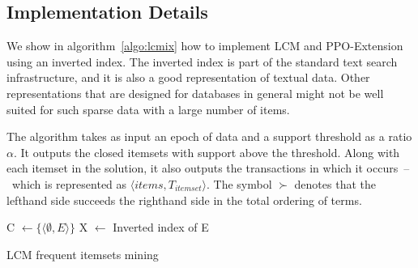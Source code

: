 \documentclass{sig-alternate}
\begin{document}
\subsection{Implementation Details}
We show in algorithm~\ref{algo:lcmix} how to implement LCM and PPO-Extension
using an inverted index.
The inverted index is part of the standard text search infrastructure,
and it is also a  good representation of textual data. 
Other representations that are designed for databases in general
might not be well suited for such sparse data with a large number of items. %

The algorithm takes as input an epoch of data and a support threshold as a
ratio $\alpha$.
It outputs the closed itemsets with support above the threshold.
Along with each itemset in the solution, it also outputs the transactions
in which it occurs~--~which is represented as $\langle items,
T_{itemset} \rangle$.
The symbol $\succ$ denotes that the lefthand side  succeeds the righthand
side in the total ordering of terms. 

\begin{algorithm}
\SetAlgoLined
\LinesNumbered
{}

C $\gets \{\langle \emptyset, E\rangle\}$ 
X $\gets$ Inverted index of E\;
\;


\caption{LCM frequent itemsets mining}
\label{algo:lcmix}
\end{algorithm}
\end{document}
